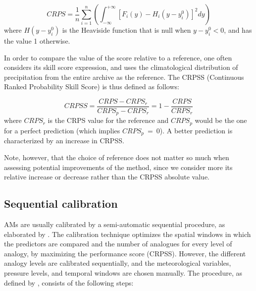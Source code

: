 \documentclass[review]{elsarticle}
\begin{document}
\begin{equation}
\label{eq:CRPS}
CRPS = \frac{1}{n} \sum_{i=1}^{n} \left(  \int_{-\infty}^{+\infty} \left[ F_{i}(y)-H_{i}(y-y_{i}^{0})\right]^{2} dy \right) 
\end{equation}
where $H(y-y_{i}^{0})$ is the Heaviside function that is null when $y-y_{i}^{0}<0$, and has the value 1 otherwise.

In order to compare the value of the score relative to a reference, one often considers its skill score expression, and uses the climatological distribution of precipitation from the entire archive as the reference. The CRPSS (Continuous Ranked Probability Skill Score) is thus defined as follows:

\begin{equation}
\label{eq:CRPSS}
CRPSS = \frac{CRPS-CRPS_{r}}{CRPS_{p}-CRPS_{r}} = 1-\frac{CRPS}{CRPS_{r}}
\end{equation}
where $CRPS_{r}$ is the CRPS value for the reference and $CRPS_{p}$ would be the one for a perfect prediction (which implies $CRPS_{p}~=~0$). A better prediction is characterized by an increase in CRPSS.

Note, however, that the choice of reference does not matter so much when assessing potential improvements of the method, since we consider more its relative increase or decrease rather than the CRPSS absolute value.

\subsection{Sequential calibration}
\label{sec:sequential}

AMs are usually calibrated by a semi-automatic sequential procedure, as elaborated by \citet{Bontron2004} \cite[see also ][]{Radanovics2013, BenDaoud2016}. The calibration technique optimizes the spatial windows in which the predictors are compared and the number of analogues for every level of analogy, by maximizing the performance score (CRPSS). However, the different analogy levels are calibrated sequentially, and the meteorological variables, pressure levels, and temporal windows are chosen manually. The procedure, as defined by \citet{Bontron2004}, consists of the following steps:
\end{document}
